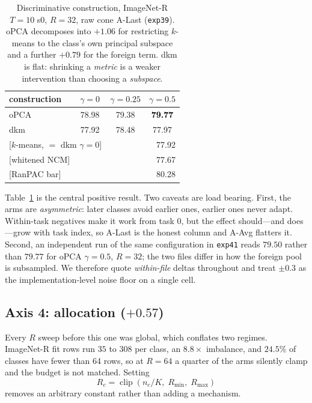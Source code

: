 \documentclass[10pt,twocolumn]{article}
\newcommand{\good}[1]{\textcolor{black}{\textbf{#1}}}
\begin{document}
\begin{table}[t]\centering\small
\begin{tabular}{lccc}
\toprule
construction & $\gamma{=}0$ & $\gamma{=}0.25$ & $\gamma{=}0.5$ \\
\midrule
oPCA & 78.98 & 79.38 & \good{79.77} \\
dkm  & 77.92 & 78.48 & 77.97 \\
\midrule
\multicolumn{2}{l}{[$k$-means, $=$ dkm $\gamma{=}0$]} & \multicolumn{2}{r}{77.92} \\
\multicolumn{2}{l}{[whitened NCM]} & \multicolumn{2}{r}{77.67} \\
\multicolumn{2}{l}{[RanPAC bar]} & \multicolumn{2}{r}{80.28} \\
\bottomrule
\end{tabular}
\caption{Discriminative construction, ImageNet-R $T{=}10$ s0, $R{=}32$, raw cone
A-Last (\texttt{exp39}). oPCA decomposes into $+1.06$ for restricting $k$-means
to the class's own principal subspace and a further $+0.79$ for the foreign
term. dkm is flat: shrinking a \emph{metric} is a weaker intervention than
choosing a \emph{subspace}.}
\label{tab:opca}
\end{table}

Table~\ref{tab:opca} is the central positive result. Two caveats are load
bearing. First, the arms are \emph{asymmetric}: later classes avoid earlier
ones, earlier ones never adapt. Within-task negatives make it work from task
$0$, but the effect should---and does---grow with task index, so A-Last is the
honest column and A-Avg flatters it. Second, an independent run of the same
configuration in \texttt{exp41} reads $79.50$ rather than $79.77$ for
oPCA $\gamma{=}0.5$, $R{=}32$; the two files differ in how the foreign pool is
subsampled. We therefore quote \emph{within-file} deltas throughout and treat
$\pm0.3$ as the implementation-level noise floor on a single cell.

\subsection{Axis 4: allocation ($+0.57$)}
\label{sec:alloc}

Every $R$ sweep before this one was global, which conflates two regimes.
ImageNet-R fit rows run $35$ to $308$ per class, an $8.8\times$ imbalance, and
$24.5\%$ of classes have fewer than 64 rows, so at $R{=}64$ a quarter of the
arms silently clamp and the budget is not matched. Setting
\begin{equation}
R_c=\operatorname{clip}(n_c/K,\;R_{\min},\;R_{\max})
\end{equation}
removes an arbitrary constant rather than adding a mechanism.
\end{document}
